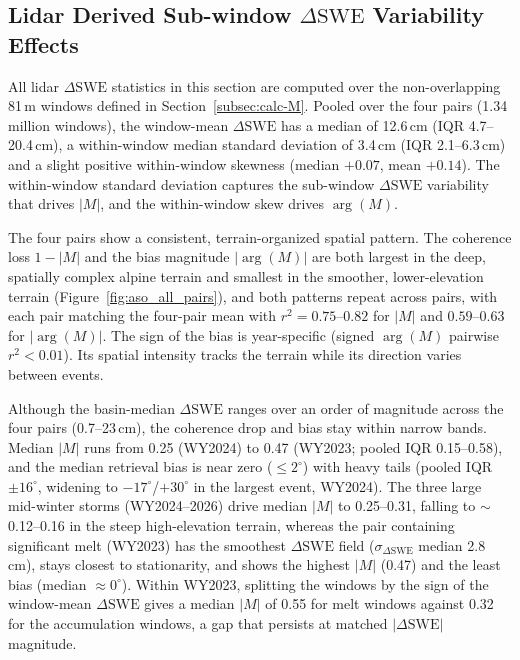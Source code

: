 \documentclass[tc, manuscript]{copernicus}
\begin{document}
\subsection{Lidar Derived Sub-window $\Delta\mathrm{SWE}$ Variability Effects}\label{subsec:lidar-variability}

All lidar $\Delta\mathrm{SWE}$ statistics in this section are computed over the non-overlapping 81\,\unit{m} windows defined in Section~\ref{subsec:calc-M}. Pooled over the four pairs (1.34 million windows), the window-mean $\Delta\mathrm{SWE}$ has a median of 12.6\,\unit{cm} (IQR 4.7--20.4\,\unit{cm}), a within-window median standard deviation of 3.4\,\unit{cm} (IQR 2.1--6.3\,\unit{cm}) and a slight positive within-window skewness (median $+0.07$, mean $+0.14$). The within-window standard deviation captures the sub-window $\Delta\mathrm{SWE}$ variability that drives $|M|$, and the within-window skew drives $\arg(M)$.

The four pairs show a consistent, terrain-organized spatial pattern. The coherence loss $1-|M|$ and the bias magnitude $|\arg(M)|$ are both largest in the deep, spatially complex alpine terrain and smallest in the smoother, lower-elevation terrain (Figure~\ref{fig:aso_all_pairs}), and both patterns repeat across pairs, with each pair matching the four-pair mean with $r^2=0.75$--$0.82$ for $|M|$ and $0.59$--$0.63$ for $|\arg(M)|$. The sign of the bias is year-specific (signed $\arg(M)$ pairwise $r^2<0.01$). Its spatial intensity tracks the terrain while its direction varies between events.

Although the basin-median $\Delta\mathrm{SWE}$ ranges over an order of magnitude across the four pairs (0.7--23\,\unit{cm}), the coherence drop and bias stay within narrow bands. Median $|M|$ runs from 0.25 (WY2024) to 0.47 (WY2023; pooled IQR 0.15--0.58), and the median retrieval bias is near zero ($\leq2^\circ$) with heavy tails (pooled IQR $\pm16^\circ$, widening to $-17^\circ$/$+30^\circ$ in the largest event, WY2024). The three large mid-winter storms (WY2024--2026) drive median $|M|$ to 0.25--0.31, falling to $\sim$0.12--0.16 in the steep high-elevation terrain, whereas the pair containing significant melt (WY2023) has the smoothest $\Delta\mathrm{SWE}$ field ($\sigma_{\Delta\mathrm{SWE}}$ median 2.8\,\unit{cm}), stays closest to stationarity, and shows the highest $|M|$ (0.47) and the least bias (median $\approx0^\circ$). Within WY2023, splitting the windows by the sign of the window-mean $\Delta\mathrm{SWE}$ gives a median $|M|$ of 0.55 for melt windows against 0.32 for the accumulation windows, a gap that persists at matched $|\Delta\mathrm{SWE}|$ magnitude.
\end{document}

